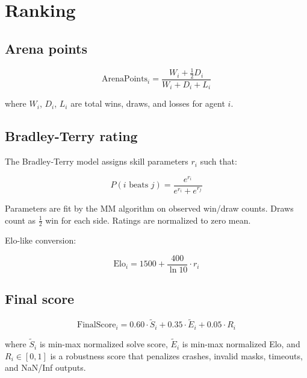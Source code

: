 \documentclass[11pt,a4paper]{article}
\begin{document}
\section{Ranking}

\subsection{Arena points}

\begin{equation}
  \text{ArenaPoints}_i = \frac{W_i + \tfrac{1}{2} D_i}{W_i + D_i + L_i}
\end{equation}

where $W_i$, $D_i$, $L_i$ are total wins, draws, and losses for agent $i$.

\subsection{Bradley-Terry rating}

The Bradley-Terry model assigns skill parameters $r_i$ such that:

\begin{equation}
  P(i \text{ beats } j) = \frac{e^{r_i}}{e^{r_i} + e^{r_j}}
  \label{eq:bradley-terry}
\end{equation}

Parameters are fit by the MM algorithm on observed win/draw counts.
Draws count as $\tfrac{1}{2}$ win for each side. Ratings are normalized to zero mean.

Elo-like conversion:

\begin{equation}
  \text{Elo}_i = 1500 + \frac{400}{\ln 10} \cdot r_i
\end{equation}

\subsection{Final score}

\begin{equation}
  \text{FinalScore}_i = 0.60 \cdot \widetilde{S}_i + 0.35 \cdot \widetilde{E}_i + 0.05 \cdot R_i
  \label{eq:final-score}
\end{equation}

where $\widetilde{S}_i$ is min-max normalized solve score, $\widetilde{E}_i$ is min-max
normalized Elo, and $R_i \in [0,1]$ is a robustness score that penalizes crashes,
invalid masks, timeouts, and NaN/Inf outputs.
\end{document}
